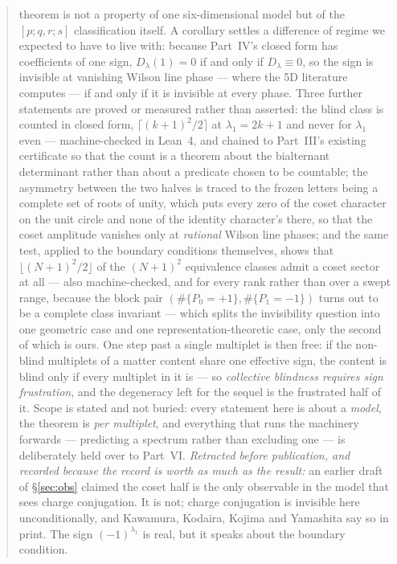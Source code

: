 \documentclass[11pt,a4paper]{article}
\newcommand{\Dl}{D_\lambda}
\begin{document}
\begin{abstract}
theorem is not a property of one six-dimensional model but of the $[p;q,r;s]$ classification itself.
A corollary settles a difference of regime we expected to have to live with: because Part~IV's
closed form has coefficients of one sign, $\Dl(1)=0$ if and only if $\Dl\equiv0$, so the sign is
invisible at vanishing Wilson line phase --- where the 5D literature computes --- if and only if it
is invisible at every phase. Three further statements are proved or measured rather than asserted:
the blind class is counted in closed form, $\lceil(k+1)^2/2\rceil$ at $\lambda_1=2k+1$ and never for
$\lambda_1$ even --- machine-checked in Lean~4, and chained to Part~III's existing certificate so
that the count is a theorem about the bialternant determinant rather than about a predicate chosen
to be countable; the asymmetry between the two halves is traced to the frozen letters being a
complete set of roots of unity, which puts every zero of the coset character on the unit circle and
none of the identity character's there, so that the coset amplitude vanishes only at \emph{rational}
Wilson line phases; and the same test, applied to the boundary conditions themselves, shows that
$\lfloor(N+1)^2/2\rfloor$ of the $(N+1)^2$ equivalence classes admit a coset sector at all --- also
machine-checked, and for every rank rather than over a swept range, because the block pair
$(\#\{P_0{=}{+}1\},\#\{P_1{=}{-}1\})$ turns out to be a complete class invariant --- which
splits the invisibility question into one geometric case and one representation-theoretic case, only
the second of which is ours. One step past a single multiplet is then free: if the non-blind
multiplets of a matter content share one effective sign, the content is blind only if every multiplet
in it is --- so \emph{collective blindness requires sign frustration}, and the degeneracy left for
the sequel is the frustrated half of it. Scope is stated and not buried: every statement here is
about a \emph{model}, the theorem is \emph{per multiplet}, and everything that runs the machinery forwards
--- predicting a spectrum rather than excluding one --- is deliberately held over to Part~VI. \emph{Retracted before publication, and
recorded because the record is worth as much as the result:} an earlier draft of \S\ref{sec:obs}
claimed the coset half is the only observable in the model that sees charge conjugation. It is not;
charge conjugation is invisible here unconditionally, and Kawamura, Kodaira, Kojima and Yamashita
say so in print. The sign $(-1)^{\lambda_1}$ is real, but it speaks about the boundary condition.
\end{abstract}
\end{document}
